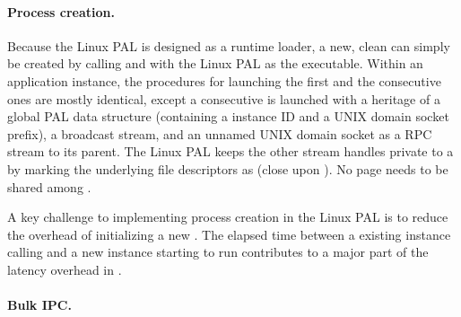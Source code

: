 \paragraph{Process creation.}
Because the Linux PAL is designed as a runtime loader,
a new, clean \picoproc{} can simply be created by calling  and  with the Linux PAL as the executable.
Within an application instance, the procedures for launching the first \picoproc{} and the consecutive ones
are mostly identical,
except a consecutive \picoproc{} is launched with a heritage of a global PAL data structure (containing a \graphene{} instance ID and a UNIX domain socket prefix), a broadcast stream,
and an unnamed UNIX domain socket as a RPC stream to its parent.
The Linux PAL keeps the other stream handles private to a \picoproc{}
by marking the underlying file descriptors
as  (close upon ).
No page needs to be shared among \picoprocs{}.


A key challenge to implementing process creation in the Linux PAL
is to reduce the overhead
of initializing a new \picoproc{}.
The elapsed time between a existing \thelibos{} instance calling  and a new \thelibos{} instance starting to run
contributes to a major part of the  latency overhead
in \graphene{}.






\paragraph{Bulk IPC.}


